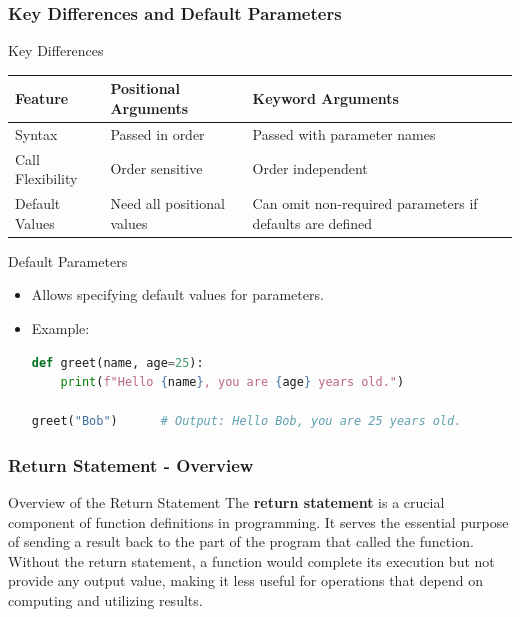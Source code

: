 \documentclass{beamer}
\begin{document}
\begin{frame}[fragile]
    \frametitle{Key Differences and Default Parameters}
    \begin{block}{Key Differences}
        \begin{center}
            \begin{tabular}{|l|l|l|}
                \hline
                Feature                     & Positional Arguments                 & Keyword Arguments                 \\
                \hline
                Syntax                      & Passed in order                     & Passed with parameter names       \\
                \hline
                Call Flexibility            & Order sensitive                     & Order independent                 \\
                \hline
                Default Values              & Need all positional values          & Can omit non-required parameters if defaults are defined \\
                \hline
            \end{tabular}
        \end{center}
    \end{block}

    \begin{block}{Default Parameters}
        \begin{itemize}
            \item Allows specifying default values for parameters.
            \item Example:
            \begin{lstlisting}[language=Python]
def greet(name, age=25):
    print(f"Hello {name}, you are {age} years old.")

greet("Bob")      # Output: Hello Bob, you are 25 years old.
            \end{lstlisting}
        \end{itemize}
    \end{block}
\end{frame}

\begin{frame}[fragile]
    \frametitle{Return Statement - Overview}
    \begin{block}{Overview of the Return Statement}
        The \textbf{return statement} is a crucial component of function definitions in programming. It serves the essential purpose of sending a result back to the part of the program that called the function. Without the return statement, a function would complete its execution but not provide any output value, making it less useful for operations that depend on computing and utilizing results.
    \end{block}
\end{frame}
\end{document}
